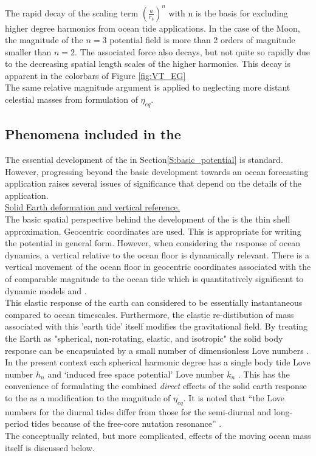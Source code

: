 The rapid decay of the scaling term $\left(\frac{a}{r_b} \right)^n$ with n is the basis for excluding higher degree harmonics from ocean tide applications.  In the case of the Moon, the magnitude of the $n=3$ potential field is more than 2 orders of magnitude smaller than $n=2$.  The associated force also decays, but not quite so rapidly due to the decreasing spatial length scales of the higher harmonics.  This decay is apparent in the colorbars of Figure \ref{fig:VT_EG}\\
The same relative magnitude argument is applied to neglecting more distant celestial masses from formulation of $\eta_{eq}$.



\subsection{Phenomena included in the \ATGP{}}
\label{S:ATGP_extras}
The essential development of the \ATGP{} in Section\ref{S:basic_potential} is standard.  However, progressing beyond the basic development towards an ocean forecasting application raises several issues of significance that depend on the details of the application.\\


\underline{Solid Earth deformation and vertical reference.}  \\
The basic spatial perspective behind the development of the \ATGP{} is the thin shell approximation.  Geocentric coordinates are used.  This is appropriate for writing the potential in general form.  However, when considering the response of ocean dynamics, a vertical relative to the ocean floor is dynamically relevant.  There is a vertical movement of the ocean floor in geocentric coordinates associated with the \ATGP{} of comparable magnitude to the ocean tide which is quantitatively significant to dynamic models \citep{Hendershott:1981ub} and \citep[pp.336]{gill1982atmosphere}.\\
This elastic response of the earth can considered to be essentially instantaneous compared to ocean timescales.  Furthermore, the elastic re-distibution of mass associated with this 'earth tide' itself modifies the gravitational field.    By treating the Earth as "spherical, non-rotating, elastic, and isotropic" the solid body response can be encapsulated by a small number of dimensionless Love numbers \citep{Agnew:2011ub}.  In the present context each spherical harmonic degree has a single body tide Love number $h_n$ and `induced free space potential' Love number $k_n$ \citep[Sec 5.3.3]{Urban:2013vl}. This has the convenience of formulating the combined \emph{direct} effects of the solid earth response to the \ATGP{} as a modification to the magnitude of $\eta_{eq}$.  It is noted that ``the Love numbers for the diurnal tides differ from those for the semi-diurnal and long-period tides because of the free-core nutation resonance'' \citep{Arbic:2004wz}.\\
The conceptually related, but more complicated, effects of the moving ocean mass itself is discussed below.

